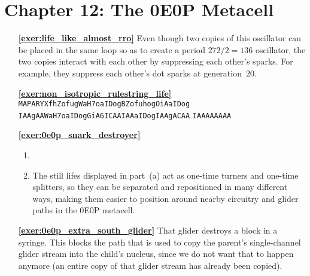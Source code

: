 \hypertarget{solutions_0e0p}{}\label{solutions_0e0p}
\section*{Chapter 12: The 0E0P Metacell}
\renewcommand{\chapterfolder}{0e0p/}

\begin{multicols}{2}
	\begin{itemize}[leftmargin=0em]
		\item[\bf\color{ocre}\sffamily\ref{exer:life_like_almost_rro}] Even though two copies of this oscillator can be placed in the same loop so as to create a period $272/2 = 136$ oscillator, the two copies interact with each other by suppressing each other's sparks. For example, they suppress each other's dot sparks at generation~$20$.\\
		
		
		\item[\bf\color{ocre}\sffamily\ref{exer:non_isotropic_rulestring_life}] \texttt{MAPARYXfhZofugWaH7oaIDogBZofuhogOiAaIDog} \texttt{IAAgAAWaH7oaIDogGiA6ICAAIAAaIDogIAAgACAA} \texttt{IAAAAAAAA}\\
		
		
		\item[\bf\color{ocre}\sffamily\ref{exer:0e0p_snark_destroyer}] \begin{enumerate}[leftmargin=1.5em,label=\bf\color{ocre}(\alph*)]
			\item {} \\
			
			\item The still lifes displayed in part~(a) act as one-time turners and one-time splitters, so they can be separated and repositioned in many different ways, making them easier to position around nearby circuitry and glider paths in the 0E0P metacell.\\
		\end{enumerate}
	
	
		\item[\bf\color{ocre}\sffamily\ref{exer:0e0p_extra_south_glider}] That glider destroys a block in a syringe. This blocks the path that is used to copy the parent's single-channel glider stream into the child's nucleus, since we do not want that to happen anymore (an entire copy of that glider stream has already been copied).\\
		

\end{itemize}
\end{multicols}
